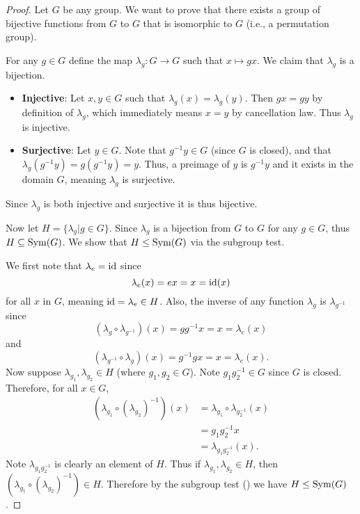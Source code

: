\begin{proof}
    Let $G$ be any group. We want to prove that there exists a group of bijective functions from $G$ to $G$ that is isomorphic to $G$ (i.e., a permutation group).

    For any $g \in G$ define the map $\lambda_g: G \to G$ such that $x \mapsto gx$. We claim that $\lambda_g$ is a bijection.
    \begin{itemize}
        \item \textbf{Injective}: Let $x, y \in G$ such that $\lambda_g(x) = \lambda_g(y)$. Then $gx = gy$ by definition of $\lambda_g$, which immediately means $x = y$ by cancellation law. Thus $\lambda_g$ is injective.

        \item \textbf{Surjective}: Let $y \in G$. Note that $g^{-1}y \in G$ (since $G$ is closed), and that $\lambda_g(g^{-1}y) = g(g^{-1}y) = y$. Thus, a preimage of $y$ is $g^{-1}y$ and it exists in the domain $G$, meaning $\lambda_g$ is surjective.
    \end{itemize}
    Since $\lambda_g$ is both injective and surjective it is thus bijective.

    Now let $H = \{\lambda_g \vert g \in G\}$. Since $\lambda_g$ is a bijection from $G$ to $G$ for any $g \in G$, thus $H \subseteq \mathrm{Sym}(G)$. We show that $H \leq \mathrm{Sym}(G)$ via the subgroup test.

    We first note that $\lambda_e = \mathrm{id}$ since
    \[
        \lambda_e(x) = ex = x = \mathrm{id}(x)
    \]
    for all $x$ in $G$, meaning $\mathrm{id} = \lambda_e \in H$. Also, the inverse of any function $\lambda_g$ is $\lambda_{g^{-1}}$ since
    \[
        (\lambda_g \circ \lambda_{g^{-1}})(x) = gg^{-1}x = x = \lambda_e(x)
    \]
    and
    \[
        (\lambda_{g^{-1}} \circ \lambda_g)(x) = g^{-1}gx = x = \lambda_e(x).
    \]
    Now suppose $\lambda_{g_1}, \lambda_{g_2} \in H$ (where $g_1, g_2 \in G$). Note $g_1g_2^{-1} \in G$ since $G$ is closed. Therefore, for all $x \in G$,
    \begin{align*}
        \left(\lambda_{g_1} \circ \left(\lambda_{g_2}\right)^{-1}\right)(x) &= \lambda_{g_1}\circ\lambda_{g_2^{-1}}(x)\\
        &= g_1g_2^{-1}x\\
        &= \lambda_{g_1g_2^{-1}}(x).
    \end{align*}
    Note $\lambda_{g_1g_2^{-1}}$ is clearly an element of $H$. Thus if $\lambda_{g_1}, \lambda_{g_2} \in H$, then $\left(\lambda_{g_1} \circ \left(\lambda_{g_2}\right)^{-1}\right) \in H$. Therefore by the subgroup test () we have $H \leq \mathrm{Sym}(G)$.


\end{proof}
